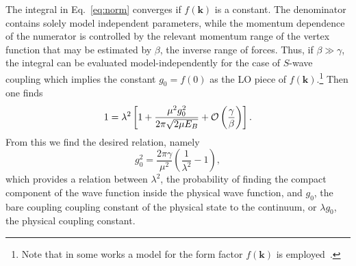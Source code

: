  The integral in Eq.~\eqref{eq:norm} converges if $f(\bm k)$ is a constant. The
 denominator contains solely model independent parameters, while the momentum
 dependence of the numerator is controlled by the relevant momentum range of the
 vertex function that may be estimated by $\beta$, the inverse range of forces.
 Thus, if $\beta \gg \gamma$,  the integral can be evaluated model-independently
 for the case of $S$-wave coupling which implies the constant $g_0=f(0)$ as the
 LO piece of $f(\bm k)$.\footnote{Note that in some works a model for
 the form factor $f(\bm k)$ is employed~\cite{Faessler:2007gv}.} Then one finds
  \begin{equation}
 1 = \lambda^2 \left[1 +\frac{\mu^2g_0^2}{2\pi\sqrt{2\mu E_B}}+ {\cal
 O}\left(\frac{\gamma}{\beta}\right)\right] .
 \end{equation}
From this
 we find the desired relation, namely
 \begin{equation}
 g_0^2 = \frac{2\pi\gamma}{\mu^2}  \left(\frac{1}{\lambda^2}-1\right)  ,
 \label{eq:gunrenorm}
 \end{equation}
which provides a relation between $\lambda^2$, the probability of finding the 
compact component of the wave function inside the physical wave function, and 
$g_0$, the bare coupling coupling constant of the physical state to the 
continuum, or $\lambda g_0$, the physical coupling constant.

